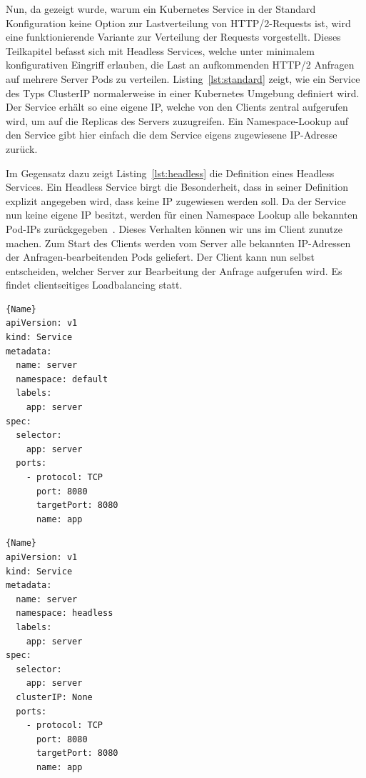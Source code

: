 Nun, da gezeigt wurde, warum ein Kubernetes Service in der Standard Konfiguration keine Option zur Lastverteilung von HTTP/2-Requests ist, wird eine funktionierende Variante zur Verteilung der Requests vorgestellt.
Dieses Teilkapitel befasst sich mit Headless Services, welche unter minimalem konfigurativen Eingriff erlauben, die Last an aufkommenden HTTP/2 Anfragen auf mehrere Server Pods zu verteilen.
Listing~\ref{lst:standard} zeigt, wie ein Service des Typs ClusterIP normalerweise in einer Kubernetes Umgebung definiert wird.
Der Service erhält so eine eigene IP, welche von den Clients zentral aufgerufen wird, um auf die Replicas des Servers zuzugreifen.
Ein Namespace-Lookup auf den Service gibt hier einfach die dem Service eigens zugewiesene IP-Adresse zurück.

Im Gegensatz dazu zeigt Listing~\ref{lst:headless} die Definition eines Headless Services.
Ein Headless Service birgt die Besonderheit, dass in seiner Definition explizit angegeben wird, dass keine IP zugewiesen werden soll.
Da der Service nun keine eigene IP besitzt, werden für einen Namespace Lookup alle bekannten Pod-IPs zurückgegeben~\cite{kubernetesNetworking}.
Dieses Verhalten können wir uns im Client zunutze machen.
Zum Start des Clients werden vom Server alle bekannten IP-Adressen der Anfragen-bearbeitenden Pods geliefert.
Der Client kann nun selbst entscheiden, welcher Server zur Bearbeitung der Anfrage aufgerufen wird.
Es findet clientseitiges Loadbalancing statt.

\noindent\begin{minipage}{.45\textwidth}
             \begin{lstlisting}[caption=Standard Service,frame=tlrb,label={lst:standard}]{Name}
apiVersion: v1
kind: Service
metadata:
  name: server
  namespace: default
  labels:
    app: server
spec:
  selector:
    app: server
  ports:
    - protocol: TCP
      port: 8080
      targetPort: 8080
      name: app
             \end{lstlisting}
\end{minipage}\hfill
\begin{minipage}{.45\textwidth}
    \begin{lstlisting}[caption=Headless Service,frame=tlrb,label={lst:headless}]{Name}
apiVersion: v1
kind: Service
metadata:
  name: server
  namespace: headless
  labels:
    app: server
spec:
  selector:
    app: server
  clusterIP: None
  ports:
    - protocol: TCP
      port: 8080
      targetPort: 8080
      name: app
    \end{lstlisting}
\end{minipage}

